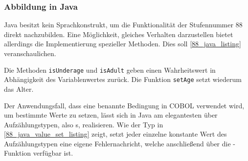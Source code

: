 \clearpage



\subsubsection*{Abbildung in Java}
Java besitzt kein Sprachkonstrukt, um die Funktionalität der Stufennummer 88 direkt nachzubilden. Eine Möglichkeit, gleiches Verhalten darzustellen bietet allerdings die Implementierung spezieller Methoden. Dies soll \autoref{88_java_listing} veranschaulichen.


Die Methoden \texttt{isUnderage} und \texttt{isAdult} geben einen Wahrheitswert in Abhängigkeit des Variablenwertes zurück. Die Funktion \texttt{setAge} setzt wiederum das Alter.


Der Anwendungsfall, dass eine benannte Bedingung in COBOL verwendet wird, um bestimmte Werte zu setzen, lässt sich in Java am elegantesten über Aufzählungstypen, also s, realisieren. Wie der Typ  in \autoref{88_java_value_set_listing} zeigt, setzt jeder einzelne konstante Wert des Aufzählungstypen eine eigene Fehlernachricht, welche anschließend über die -Funktion verfügbar ist.